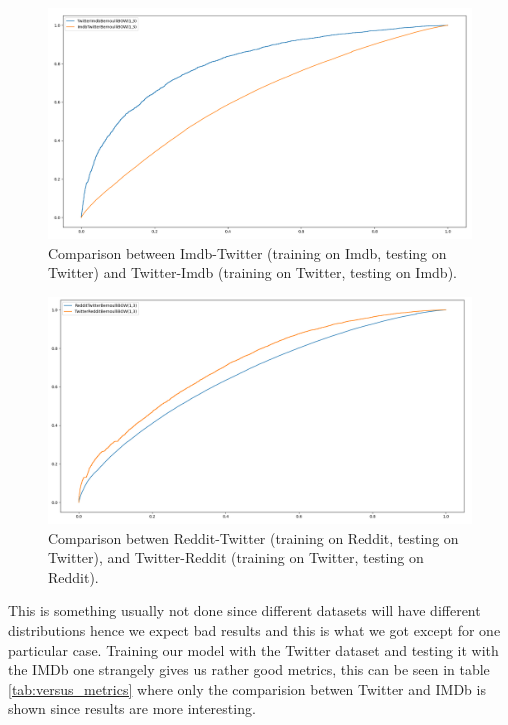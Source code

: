 \begin{figure}[h!t]
    \centering
    \includegraphics[scale=0.3]{../experiments/plots/ImdbTwitter}
    \caption{Comparison between Imdb-Twitter (training on Imdb, testing on Twitter) and Twitter-Imdb (training on Twitter, testing on Imdb).}
    \label{fig:TwitterImdb}        
\end{figure}

\begin{figure}[h!t]
    \centering
    \includegraphics[scale=0.3]{../experiments/plots/RedditTwitter}
    \caption{Comparison betwen Reddit-Twitter (training on Reddit, testing on Twitter), and Twitter-Reddit (training on Twitter, testing on Reddit).}
    \label{fig:TwitterReddit}
\end{figure}

This is something usually not done since different datasets will have different distributions hence we expect bad results and this is what we got except for one particular case.
Training our model with the Twitter dataset and testing it with the IMDb one strangely gives us rather good metrics, this can be seen in table \ref{tab:versus_metrics} where only the comparision betwen Twitter and IMDb is shown since results are more interesting. 

